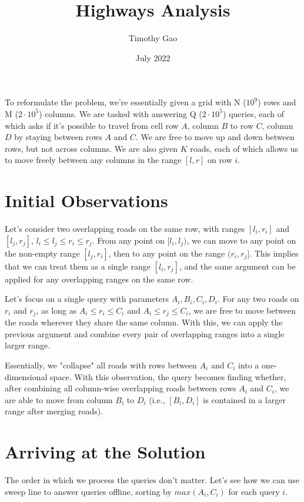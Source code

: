 \documentclass[15pt]{article}
\title{Highways Analysis}
\author{Timothy Gao}
\date{July 2022}
\begin{document}
\maketitle

To reformulate the problem, we're essentially given a grid with N ($10^9$) rows and M ($2\cdot 10^5$) columns. We are tasked with answering Q ($2\cdot 10^5$) queries, each of which asks if it's possible to travel from cell row $A$, column $B$ to row $C$, column $D$ by staying between rows $A$ and $C$. We are free to move up and down between rows, but not across columns. We are also given $K$ roads, each of which allows us to move freely between any columns in the range $[l,r]$ on row $i$.

\section{Initial Observations}

Let's consider two overlapping roads on the same row, with ranges $[l_i,r_i]$ and $[l_j,r_j]$, $l_i \leq l_j \leq r_i \leq r_j$. From any point on $[l_i, l_j)$, we can move to any point on the non-empty range $[l_j, r_i]$, then to any point on the range $(r_i, r_j]$. This implies that we can treat them as a single range $[l_i, r_j]$, and the same argument can be applied for any overlapping ranges on the same row.

Let's focus on a single query with parameters $A_i, B_i, C_i, D_i$. 
For any two roads on $r_i$ and $r_j$, as long as $A_i \leq r_i \leq C_i$ and $A_i \leq r_j \leq C_i$, we are free to move between the roads wherever they share the same column. With this, we can apply the previous argument and combine every pair of overlapping ranges into a single larger range.

Essentially, we "collapse" all roads with rows between $A_i$ and $C_i$ into a one-dimensional space. With this observation, the query becomes finding whether, after combining all column-wise overlapping roads between rows $A_i$ and $C_i$, we are able to move from column $B_i$ to $D_i$ (i.e., $[B_i, D_i]$ is contained in a larger range after merging roads).

\section{Arriving at the Solution}

The order in which we process the queries don't matter. Let's see how we can use sweep line to answer queries offline, sorting by $max(A_i, C_i)$ for each query $i$.
\end{document}
